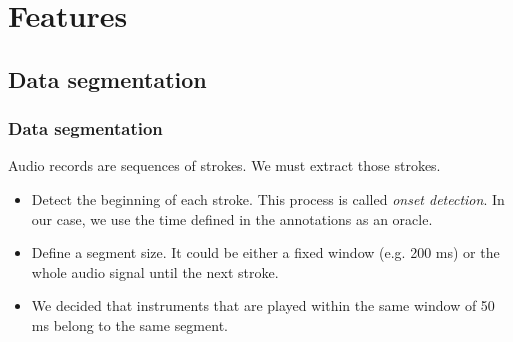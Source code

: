 \documentclass{beamer}
\begin{document}
    \section{Features}
    \subsection{Data segmentation}
    \begin{frame}
        \frametitle{Data segmentation}
        Audio records are sequences of strokes. We must extract those strokes.
        \begin{itemize}
            \item Detect the beginning of each stroke. This process is called \emph{onset detection}. In our case, we use the time defined in the annotations as an oracle.
            \item Define a segment size. It could be either a fixed window (e.g. 200 ms) or the whole audio signal until the next stroke.
            \item We decided that instruments that are played within the same window of 50 ms belong to the same segment.
        \end{itemize}
    \end{frame}
\end{document}

